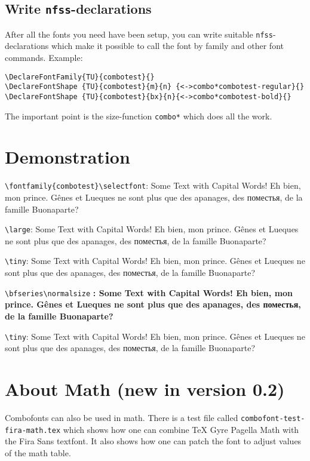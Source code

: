 \documentclass[parskip=half-,egregdoesnotlikesansseriftitles]{scrartcl}
\begin{document}
\subsection{Write \texttt{nfss}-declarations}

After all the fonts you need have been setup, you can write suitable \texttt{nfss}-declarations which make it possible to call the font by family and other font commands. Example:

\begin{verbatim}
\DeclareFontFamily{TU}{combotest}{}
\DeclareFontShape {TU}{combotest}{m}{n} {<->combo*combotest-regular}{}
\DeclareFontShape {TU}{combotest}{bx}{n}{<->combo*combotest-bold}{}
\end{verbatim}

The important point is the size-function \verb+combo*+ which does all the work.


\section{Demonstration}


\verb+\fontfamily{combotest}\selectfont+:
\selectfont
Some Text with Capital Words!
Eh bien, mon prince. Gênes et Lueques ne sont plus que des
apanages, des поместья, de la famille Buonaparte?
%

\verb+\large+\large:
Some Text with Capital Words!
Eh bien, mon prince. Gênes et Lueques ne sont plus que des
apanages, des поместья, de la famille Buonaparte?

\verb+\tiny+\tiny:
Some Text with Capital Words!
Eh bien, mon prince. Gênes et Lueques ne sont plus que des
apanages, des поместья, de la famille Buonaparte?

\verb+\bfseries\normalsize+\bfseries
\normalsize:
Some Text with Capital Words!
Eh bien, mon prince. Gênes et Lueques ne sont plus que des
apanages, des поместья, de la famille Buonaparte?


\verb+\tiny+\tiny:
Some Text with Capital Words!
Eh bien, mon prince. Gênes et Lueques ne sont plus que des
apanages, des поместья, de la famille Buonaparte?
%

\normalfont\normalsize

\section{About Math (new in version 0.2)}\enlargethispage{2\baselineskip}

Combofonts can also be used in math. There is a test file called \texttt{combofont-test-fira-math.tex} which shows how one can combine \textsf{TeX Gyre Pagella Math} with the \textsf{Fira Sans} textfont. It also shows how one can patch the font to adjust values of the math table.
\end{document}
